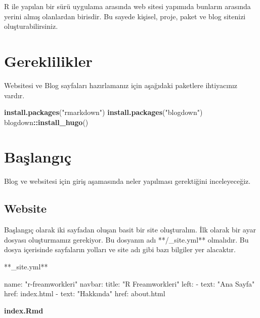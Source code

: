 \documentclass[]{book}
\newenvironment{Shaded}{\begin{snugshade}}{\end{snugshade}}
\newcommand{\KeywordTok}[1]{\textcolor[rgb]{0.13,0.29,0.53}{\textbf{#1}}}
\newcommand{\BaseNTok}[1]{\textcolor[rgb]{0.00,0.00,0.81}{#1}}
\newcommand{\StringTok}[1]{\textcolor[rgb]{0.31,0.60,0.02}{#1}}
\newcommand{\OperatorTok}[1]{\textcolor[rgb]{0.81,0.36,0.00}{\textbf{#1}}}
\newcommand{\NormalTok}[1]{#1}
\begin{document}
R ile yapılan bir sürü uygulama arasında web sitesi yapımıda bunların
arasında yerini almış olanlardan birisdir. Bu sayede kişisel, proje,
paket ve blog sitenizi oluşturabilirsiniz.

\section{Gereklilikler}\label{gereklilikler-4}

Websitesi ve Blog sayfaları hazırlamanız için aşağıdaki paketlere
ihtiyacınız vardır.

\begin{Shaded}
\begin{Highlighting}[]
\KeywordTok{install.packages}\NormalTok{(}\StringTok{"rmarkdown"}\NormalTok{)}
\KeywordTok{install.packages}\NormalTok{(}\StringTok{"blogdown"}\NormalTok{)}
\NormalTok{blogdown}\OperatorTok{::}\KeywordTok{install_hugo}\NormalTok{()}
\end{Highlighting}
\end{Shaded}

\section{Başlangıç}\label{baslangc-3}

Blog ve websitesi için giriş aşamasında neler yapılması gerektiğini
inceleyeceğiz.

\subsection{Website}\label{website}

Başlangıç olarak iki sayfadan oluşan basit bir site oluşturalım. İlk
olarak bir ayar dosyası oluşturmamız gerekiyor. Bu dosyanın adı
**/\_site.yml** olmalıdır. Bu dosya içerisinde sayfaların yolları ve
site adı gibi bazı bilgiler yer alacaktır.

**\_site.yml**

\begin{Shaded}
\begin{Highlighting}[]
\NormalTok{name: "r-freamworkleri"}
\NormalTok{navbar:}
\NormalTok{  title: "R Freamworkleri"}
\NormalTok{  left:}
\BaseNTok{    - text: "Ana Sayfa"}
\BaseNTok{      href: index.html}
\BaseNTok{    - text: "Hakkında"}
\BaseNTok{      href: about.html}
\end{Highlighting}
\end{Shaded}

\textbf{index.Rmd}
\end{document}
